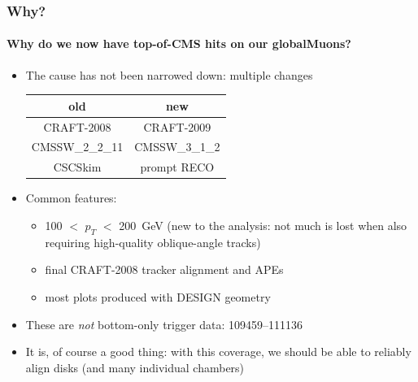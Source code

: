 \documentclass[compress]{beamer}
\begin{document}
\begin{frame}
\frametitle{Why?}
\framesubtitle{Why do we now have top-of-CMS hits on our globalMuons?}

\begin{itemize}
\item The cause has not been narrowed down: multiple changes

\begin{center}
\renewcommand{\arraystretch}{1.5}
\begin{tabular}{c | c}
{\bf old} & {\bf new} \\\hline
CRAFT-2008 & CRAFT-2009 \\
CMSSW\_2\_2\_11 & CMSSW\_3\_1\_2 \\
CSCSkim & prompt RECO \\
\end{tabular}
\end{center}

\item Common features:
\begin{itemize}
\item 100 $<$ $p_T$ $<$ 200~GeV (new to the analysis: not much is lost
  when also requiring high-quality oblique-angle tracks)
\item final CRAFT-2008 tracker alignment and APEs
\item most plots produced with DESIGN geometry
\end{itemize}

\item These are {\it not} bottom-only trigger data: 109459--111136
\item It is, of course a good thing: with this coverage, we should be
  able to reliably align disks (and many individual chambers)
\end{itemize}
\end{frame}
\end{document}
